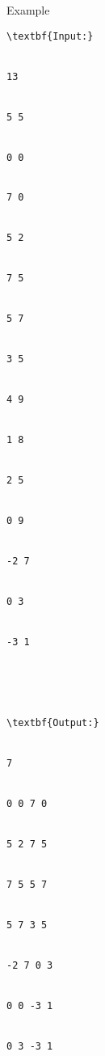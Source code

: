 Example
\begin{verbatim}
\textbf{Input:}


13


5 5


0 0


7 0


5 2


7 5


5 7


3 5


4 9


1 8


2 5


0 9


-2 7


0 3


-3 1





\textbf{Output:}


7


0 0 7 0


5 2 7 5


7 5 5 7


5 7 3 5


-2 7 0 3


0 0 -3 1


0 3 -3 1


\end{verbatim}